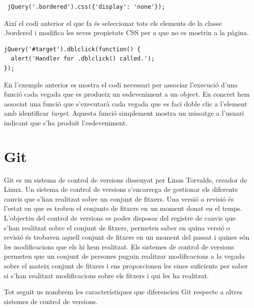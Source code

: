 \begin{lstlisting}
 jQuery('.bordered').css({'display': 'none'});
\end{lstlisting}

Així el codi anterior el que fa és seleccionar tots els elements de la classe .bordered i modifica les seves propietats CSS per a que no es mostrin a la pàgina. 

\begin{lstlisting}
jQuery('#target').dblclick(function() {
  alert('Handler for .dblclick() called.');
});
\end{lstlisting}

En l'exemple anterior es mostra el codi necessari per associar l'execució d'una funció cada vegada que es produeix un esdeveniment a un object. En concret hem associat una funció que s'executarà cada vegada que es faci doble clic a l'element amb identificar \emph{target}. Aquesta funció simplement mostra un missatge a l'usuari indicant que s'ha produït l'esdeveniment. 

\section{Git}

Git es un sistema de control de versions dissenyat per Linus Torvalds, creador de Linux. Un sistema de control de versions s'encarrega de gestionar els diferents canvis que s'han realitzat sobre un conjunt de fitxers. Una versió o revisió és l'estat en que es troben el conjunts de fitxers en un moment donat en el temps. L'objectiu del control de versions es poder disposar del registre de canvis que s'han realitzat sobre el conjunt de fitxers, permeten saber en quina versió o revisió és trobaven aquell conjunt de fitxers en un moment del passat i quines són les modificacions que els hi hem realitzat. Els sistemes de control de versions permeten que un conjunt de persones puguin realitzar modificacions a la vegada sobre el mateix conjunt de fitxers i ens proporcionen les eines suficients per saber si s'han realitzat modificacions sobre els fitxers i qui les ha realitzat. 

Tot seguit us nombrem les característiques que diferencien Git respecte a altres sistemes de control de versions.

